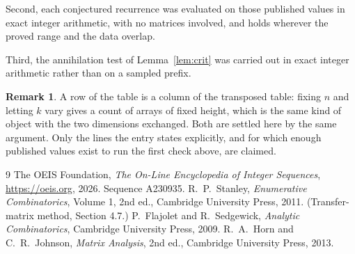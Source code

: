 \documentclass[11pt,a4paper]{article}
\theoremstyle{plain}
\theoremstyle{definition}
\newtheorem{remark}[theorem]{Remark}
\begin{document}
Second, each conjectured recurrence was evaluated on those published values in exact
integer arithmetic, with no matrices involved, and holds wherever the proved range and the
data overlap.

Third, the annihilation test of Lemma~\ref{lem:crit} was carried out in exact integer
arithmetic rather than on a sampled prefix.

\begin{remark}
A row of the table is a column of the transposed table: fixing $n$ and letting $k$ vary gives a
count of arrays of fixed height, which is the same kind of object with the two dimensions
exchanged. Both are settled here by the same argument. Only the lines the entry states
explicitly, and for which enough published values exist to run the first check above, are
claimed.
\end{remark}

\begin{thebibliography}{9}
 The OEIS Foundation, \emph{The On-Line Encyclopedia of Integer
Sequences}, \url{https://oeis.org}, 2026. Sequence A230935.
 R.~P.~Stanley, \emph{Enumerative Combinatorics}, Volume 1, 2nd ed.,
Cambridge University Press, 2011. (Transfer-matrix method, Section 4.7.)
 P.~Flajolet and R.~Sedgewick, \emph{Analytic Combinatorics}, Cambridge
University Press, 2009.
 R.~A.~Horn and C.~R.~Johnson, \emph{Matrix Analysis}, 2nd ed., Cambridge
University Press, 2013.
\end{thebibliography}
\end{document}
